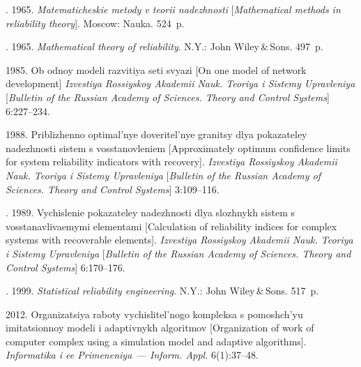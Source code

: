   \begin{multicols}{2}

\renewcommand{\bibname}{\protect\rmfamily References}

{\small\frenchspacing
{%
\begin{thebibliography}{99}

. 1965. 
\textit{Matematicheskie metody v teorii nadezhnosti}
[\textit{Mathematical methods in reliability theory}]. Moscow: Nauka. 524~p.


. 1965. \textit{Mathematical theory of 
reliability}. N.Y.: John Wiley\,\&\,Sons. 497~p. 

 1985. Ob odnoy modeli razvitiya seti svya\-zi
[On one model of network development] 
\textit{Izvestiya Rossiyskoy Akademii Nauk. Teoriya i Sistemy Upravleniya} 
[\textit{Bulletin of the Russian Academy of Sciences. Theory and Control Systems}]
6:227--234.


 1988. Priblizhenno optimal'nye doveritel'nye granitsy dlya 
pokazateley nadezhnosti sistem s vosstanovleniem 
 [Approximately optimum confidence limits for system reliability indicators with recovery].
\textit{Izvestiya Rossiyskoy 
Akademii Nauk. Teoriya i Sistemy Upravleniya} 
[\textit{Bulletin of the Russian Academy of Sciences. Theory and Control Systems}]
3:109--116.

. 1989. Vychislenie pokazateley 
nadezhnosti dlya slozhnykh sistem s vosstanav\-li\-va\-emy\-mi elementami
[Calculation of reliability indices for complex systems with recoverable elements].
\textit{Izvestiya Rossiyskoy Akademii Nauk. Teoriya i Sistemy Upravleniya} 
[\textit{Bulletin of the Russian Academy of Sciences. Theory and Control Systems}]
6:170--176.



. 1999. 
\textit{Statistical reliability engineering}. N.Y.: John Wiley\,\&\,Sons. 517~p.

 2012. Organizatsiya raboty vychislitel'nogo 
kompleksa s pomoshch'yu imitatsionnoy modeli i adaptivnykh algoritmov
[Organization of work of computer complex using a simulation model and adaptive algorithms].
\textit{Informatika i ee Primeneniya}~--- \textit{Inform. Appl.}  6(1):37--48.


\end{thebibliography}}}
\end{multicols}
